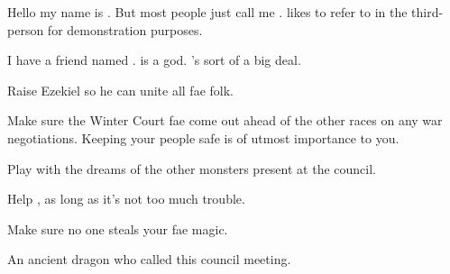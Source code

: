 \documentclass[char]{guardians}
\begin{document}
\name{\cMatt{}}

Hello my name is \cMatt{\intro}. But most people just call me \cMatt{}. \cMatt{\They} likes to refer to \cMatt{\themself} in the third-person for demonstration purposes.

I have a friend named \cZeus{\intro}. \cZeus{} is a god. \cZeus{\They}'s sort of a big deal.

\begin{itemz}[Goals]
  \item Raise Ezekiel so he can unite all fae folk.
  \item Make sure the Winter Court fae come out ahead of the other races on any war negotiations. Keeping your people safe is of utmost importance to you.
  \item Play with the dreams of the other monsters present at the council.
  \item Help \cMatt{}, as long as it's not too much trouble.
  \item Make sure no one steals your fae magic.
\end{itemz}


\begin{contacts}
  \contact{\cMatt{}} An ancient dragon who called this council meeting.
\end{contacts}
\end{document}

